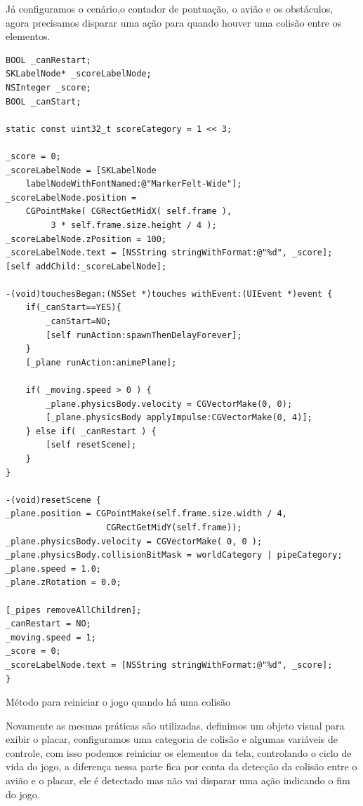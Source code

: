 \documentclass[a4paper,12pt,brazil,oneside]{book}
\begin{document}
Já configuramos o cenário,o contador de pontuação, o avião e os obstáculos, agora precisamos disparar uma ação para quando houver uma colisão entre os elementos.

\begin{listing}[H]
\begin{verbatim}
BOOL _canRestart;
SKLabelNode* _scoreLabelNode;
NSInteger _score;
BOOL _canStart;

static const uint32_t scoreCategory = 1 << 3;

_score = 0;
_scoreLabelNode = [SKLabelNode 
	labelNodeWithFontNamed:@"MarkerFelt-Wide"];
_scoreLabelNode.position = 
	CGPointMake( CGRectGetMidX( self.frame ),
		 3 * self.frame.size.height / 4 );
_scoreLabelNode.zPosition = 100;
_scoreLabelNode.text = [NSString stringWithFormat:@"%d", _score];
[self addChild:_scoreLabelNode];
       
-(void)touchesBegan:(NSSet *)touches withEvent:(UIEvent *)event {
    if(_canStart==YES){
        _canStart=NO;
        [self runAction:spawnThenDelayForever];
    }
    [_plane runAction:animePlane];
    
    if( _moving.speed > 0 ) {
        _plane.physicsBody.velocity = CGVectorMake(0, 0);
        [_plane.physicsBody applyImpulse:CGVectorMake(0, 4)];
    } else if( _canRestart ) {
        [self resetScene];
    }
}

-(void)resetScene {
_plane.position = CGPointMake(self.frame.size.width / 4, 
					CGRectGetMidY(self.frame));
_plane.physicsBody.velocity = CGVectorMake( 0, 0 );
_plane.physicsBody.collisionBitMask = worldCategory | pipeCategory;
_plane.speed = 1.0;
_plane.zRotation = 0.0;
    
[_pipes removeAllChildren];
_canRestart = NO;
_moving.speed = 1;
_score = 0;
_scoreLabelNode.text = [NSString stringWithFormat:@"%d", _score];
}
\end{verbatim}
\caption{Método para reiniciar o jogo quando há uma colisão}
\end{listing}

Novamente as mesmas práticas são utilizadas, definimos um objeto visual para exibir o placar, configuramos uma categoria de colisão e algumas variáveis de controle, com isso podemos reiniciar os elementos da tela, controlando o ciclo de vida do jogo, a diferença nessa parte fica por conta da detecção da colisão entre o avião e o placar, ele é detectado mas não vai disparar uma ação indicando o fim do jogo.
\end{document}
